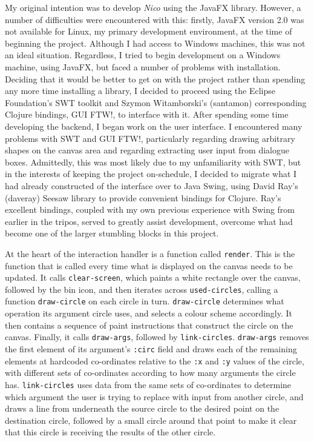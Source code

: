 \documentclass[12pt,twoside,notitlepage,xetex]{report}
\begin{document}
My original intention was to develop \emph{Nico} using the JavaFX library.
However, a number of difficulties were encountered with this: firstly, JavaFX
version 2.0 was not available for Linux, my primary development environment, at
the time of beginning the project.  Although I had access to Windows machines,
this was not an ideal situation.  Regardless, I tried to begin development on a
Windows machine, using JavaFX, but faced a number of problems with
installation.  Deciding that it would be better to get on with the project
rather than spending any more time installing a library, I decided to proceed
using the Eclipse Foundation's SWT toolkit and Szymon Witamborski's (santamon)
corresponding Clojure bindings, GUI FTW!, to interface with it.  After spending
some time developing the backend, I began work on the user interface.  I
encountered many problems with SWT and GUI FTW!, particularly regarding drawing
arbitrary shapes on the canvas area and regarding extracting user input from
dialogue boxes.  Admittedly, this was most likely due to my unfamiliarity with
SWT, but in the interests of keeping the project on-schedule, I decided to
migrate what I had already constructed of the interface over to Java Swing,
using David Ray's (daveray) Seesaw library to provide convenient bindings for
Clojure.  Ray's excellent bindings, coupled with my own previous experience
with Swing from earlier in the tripos, served to greatly assist development,
overcome what had become one of the larger stumbling blocks in this project.

At the heart of the interaction handler is a function called \verb¬render¬.
This is the function that is called every time what is displayed on the canvas
needs to be updated.  It calls \verb¬clear-screen¬, which paints a white
rectangle over the canvas, followed by the bin icon, and then iterates across
\verb¬used-circles¬, calling a function \verb¬draw-circle¬ on each circle in
turn.  \verb¬draw-circle¬ determines what operation its argument circle uses,
and selects a colour scheme accordingly.  It then contains a sequence of paint
instructions that construct the circle on the canvas.  Finally, it calls
\verb¬draw-args¬, followed by \verb¬link-circles¬.  \verb¬draw-args¬ removes
the first element of its argument's \verb¬:circ¬ field and draws each of the
remaining elements at hardcoded co-ordinates relative to the \verb¬:x¬ and
\verb¬:y¬ values of the circle, with different sets of co-ordinates according
to how many arguments the circle has.  \verb¬link-circles¬ uses data from the
same sets of co-ordinates to determine which argument the user is trying to
replace with input from another circle, and draws a line from underneath the
source circle to the desired point on the destination circle, followed by a
small circle around that point to make it clear that this circle is receiving
the results of the other circle.
\end{document}

